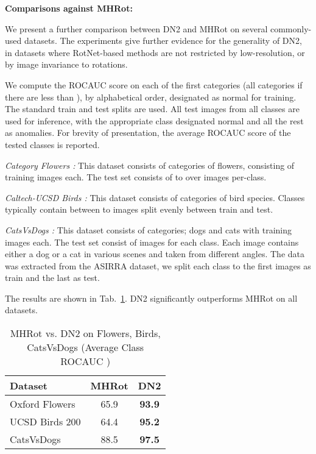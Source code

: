 \documentclass{article}
\begin{document}
\textbf{Comparisons against MHRot:}

We present a further comparison between DN2 and MHRot \cite{hendrycks2019using} on several commonly-used datasets. The experiments give further evidence for the generality of DN2, in datasets where RotNet-based methods are not restricted by low-resolution, or by image invariance to rotations.

We compute the ROCAUC score on each of the first  categories (all categories if there are less than ),  by alphabetical order, designated as normal for training. The standard train and test splits are used. All test images from all classes are used for inference, with the appropriate class designated normal and all the rest as anomalies. For brevity of presentation, the average ROCAUC score of the tested classes is reported.

\textit{ Category Flowers \cite{nilsback2008automated}:} This dataset consists of  categories of flowers, consisting of  training images each. The test set consists of  to over  images per-class. 

\textit{Caltech-UCSD Birds  \cite{wah2011caltech}:} This dataset consists of  categories of bird species. Classes typically contain between  to  images split evenly between train and test. 

\textit{ CatsVsDogs \cite{elson2007asirra}:} This dataset consists of  categories; dogs and cats with  training images each. The test set consist of  images for each class. Each image contains either a dog or a cat in various scenes and taken from different angles. The data was extracted from the ASIRRA dataset, we split each class to the first  images as train and the last  as test.

The results are shown in Tab.~\ref{tab:exp_mhrot}. DN2 significantly outperforms MHRot on all datasets.


\begin{table}
  \centering
  \caption{MHRot vs. DN2 on Flowers, Birds, CatsVsDogs (Average Class ROCAUC )}
  \label{tab:exp_mhrot}

    \begin{tabular}{lcc}
    \toprule      

 Dataset  &  MHRot & DN2 \\
    \midrule
   Oxford Flowers & 65.9 & \textbf{93.9}\\
   UCSD Birds 200 & 64.4 & \textbf{95.2}\\
   CatsVsDogs & 88.5 & \textbf{97.5}\\
	 \bottomrule
    \end{tabular}
\end{table}
\end{document}
